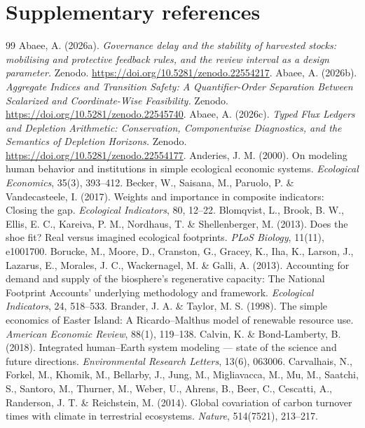 \documentclass[11pt,a4paper]{article}
\begin{document}
\section*{Supplementary references}
\begin{thebibliography}{99}
\small
{} Abaee, A. (2026a). \emph{Governance delay and the stability of harvested stocks: mobilising and protective feedback rules, and the review interval as a design parameter.} Zenodo. \url{https://doi.org/10.5281/zenodo.22554217}.
 Abaee, A. (2026b). \emph{Aggregate Indices and Transition Safety: A Quantifier-Order Separation Between Scalarized and Coordinate-Wise Feasibility.} Zenodo. \url{https://doi.org/10.5281/zenodo.22545740}.
 Abaee, A. (2026c). \emph{Typed Flux Ledgers and Depletion Arithmetic: Conservation, Componentwise Diagnostics, and the Semantics of Depletion Horizons.} Zenodo. \url{https://doi.org/10.5281/zenodo.22554177}.
 Anderies, J. M. (2000). On modeling human behavior and institutions in simple ecological economic systems. \emph{Ecological Economics}, 35(3), 393--412.
 Becker, W., Saisana, M., Paruolo, P. \& Vandecasteele, I. (2017). Weights and importance in composite indicators: Closing the gap. \emph{Ecological Indicators}, 80, 12--22.
 Blomqvist, L., Brook, B. W., Ellis, E. C., Kareiva, P. M., Nordhaus, T. \& Shellenberger, M. (2013). Does the shoe fit? Real versus imagined ecological footprints. \emph{PLoS Biology}, 11(11), e1001700.
 Borucke, M., Moore, D., Cranston, G., Gracey, K., Iha, K., Larson, J., Lazarus, E., Morales, J. C., Wackernagel, M. \& Galli, A. (2013). Accounting for demand and supply of the biosphere's regenerative capacity: The National Footprint Accounts' underlying methodology and framework. \emph{Ecological Indicators}, 24, 518--533.
 Brander, J. A. \& Taylor, M. S. (1998). The simple economics of Easter Island: A Ricardo--Malthus model of renewable resource use. \emph{American Economic Review}, 88(1), 119--138.
 Calvin, K. \& Bond-Lamberty, B. (2018). Integrated human--Earth system modeling --- state of the science and future directions. \emph{Environmental Research Letters}, 13(6), 063006.
 Carvalhais, N., Forkel, M., Khomik, M., Bellarby, J., Jung, M., Migliavacca, M., Mu, M., Saatchi, S., Santoro, M., Thurner, M., Weber, U., Ahrens, B., Beer, C., Cescatti, A., Randerson, J. T. \& Reichstein, M. (2014). Global covariation of carbon turnover times with climate in terrestrial ecosystems. \emph{Nature}, 514(7521), 213--217.

\end{thebibliography}
\end{document}
